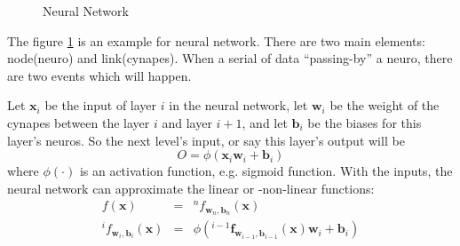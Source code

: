 \documentclass{article}
\begin{document}
\begin{figure}
  \centering
  \caption{Neural Network}
  \label{fig:nn:eg:1}
\end{figure}

The figure \ref{fig:nn:eg:1} is an example for neural network.
There are two main elements: node(neuro) and link(cynapes).
When a serial of data ``passing-by'' a neuro, there are two events which will happen.

Let $\mathbf{x}_i$ be the input of layer $i$ in the neural network, let $\mathbf{w}_i$
be the weight of the cynapes between the layer $i$ and layer $i+1$,
and let $\mathbf{b}_i$ be the biases for this layer's neuros.
So the next level's input, or say this layer's output will be
$$
  O = \phi\left(\mathbf{x}_i\mathbf{w}_i + \mathbf{b}_i\right)
$$
where $\phi(\cdot)$ is an activation function, e.g. sigmoid function.
With the inputs, the neural network can approximate the linear or -non-linear functions:
\begin{equation}
  \label{eq:nn:app}
  \begin{array}{rcl}
  f(\mathbf{x}) &=& ^nf_{\mathbf{w}_n,\mathbf{b}_n}(\mathbf{x}) \\
  {}^if_{\mathbf{w}_i,\mathbf{b}_i}(\mathbf{x}) &=& \phi\left({}^{i-1}\mathbf{f}_{\mathbf{w}_{i-1},\mathbf{b}_{i-1}}(\mathbf{x})\mathbf{w}_i + \mathbf{b}_i\right)
  \end{array}
\end{equation}
\end{document}

